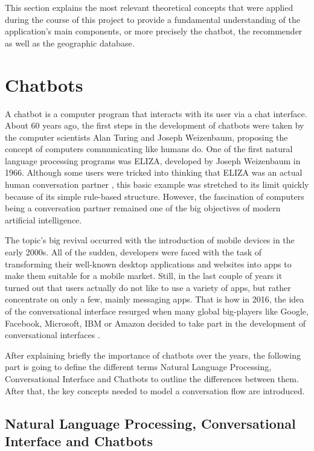 \label{ch:TC}

This section explains the most relevant theoretical concepts that were applied during the course of this project to provide a fundamental understanding of the application’s main components, or more precisely the chatbot, the recommender as well as the geographic database. 

\section{Chatbots}
A chatbot is a computer program that interacts with its user via a chat interface. About 60 years ago, the first steps in the development of chatbots were taken by the computer scientists Alan Turing and Joseph Weizenbaum, proposing the concept of computers communicating like humans do. One of the first natural language processing programs was ELIZA, developed by Joseph Weizenbaum in 1966. Although some users were tricked into thinking that ELIZA was an actual human conversation partner \cite{weizenbaum66}, this basic example was stretched to its limit quickly because of its simple rule-based structure. However, the fascination of computers being a conversation partner remained one of the big objectives of modern artificial intelligence.

The topic’s big revival occurred with the introduction of mobile devices in the early 2000s. All of the sudden, developers were faced with the task of transforming their well-known desktop applications and websites into apps to make them suitable for a mobile market. Still, in the last couple of years it turned out that users actually do not like to use a variety of apps, but rather concentrate on only a few, mainly messaging apps. That is how in 2016, the idea of the conversational interface resurged when many global big-players like Google, Facebook, Microsoft, IBM or Amazon decided to take part in the development of conversational interfaces \cite{venturebeat:chatbots}. 

After explaining briefly the importance of chatbots over the years, the following part is going to define the different terms Natural Language Processing, Conversational Interface and Chatbots to outline the differences between them. After that, the key concepts needed to model a conversation flow are introduced.


\subsection{Natural Language Processing, Conversational Interface and Chatbots}

